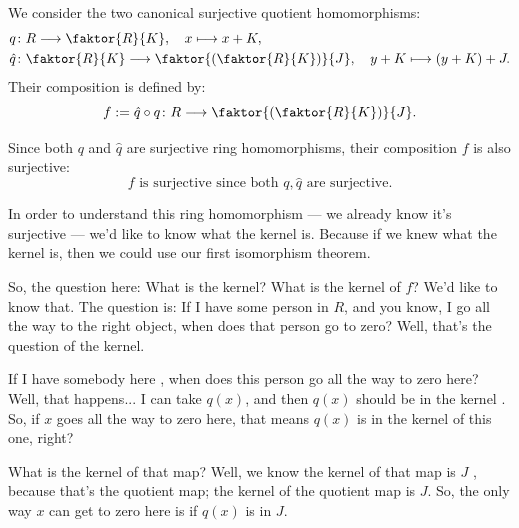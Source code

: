 \begin{content}
We consider the two canonical surjective quotient homomorphisms:
\begin{align}
q &\colon R \longrightarrow \faktor{R}{K}, \quad x \longmapsto x + K, \label{eq:first-quotient-map} \\
\hat{q} &\colon \faktor{R}{K} \longrightarrow \faktor{\left(\faktor{R}{K}\right)}{J}, \quad y + K \longmapsto (y + K) + J. \label{eq:second-quotient-map}
\end{align}
Their composition is defined by:
\begin{equation}\label{eq:composed-homomorphism}
f := \hat{q} \circ q \colon R \longrightarrow \faktor{\left(\faktor{R}{K}\right)}{J}.
\end{equation}

Since both $q$ and $\hat{q}$ are surjective ring homomorphisms, their composition $f$ is also surjective:
\begin{equation}\label{eq:f-surjective}
f \text{ is surjective since both } q, \hat{q} \text{ are surjective}.
\end{equation}
\end{content}

\begin{speech}[00:05:06 - 00:06:29]
In order to understand this ring homomorphism --- we already know it's surjective --- we'd like to know what the kernel is. Because if we knew what the kernel is, then we could use our first isomorphism theorem.

So, the question here: What is the kernel? What is the kernel of $f$?  We'd like to know that. The question is: If I have some person in $R$, and you know, I go all the way to the right object, when does that person go to zero? Well, that's the question of the kernel.

If I have somebody here , when does this person go all the way to zero here?  Well, that happens... I can take $q(x)$, and then $q(x)$ should be in the kernel . So, if $x$ goes all the way to zero here, that means $q(x)$ is in the kernel of this one, right?

What is the kernel of that map? Well, we know the kernel of that map is $J$ , because that's the quotient map; the kernel of the quotient map is $J$. So, the only way $x$ can get to zero here is if $q(x)$ is in $J$.
\end{speech}

